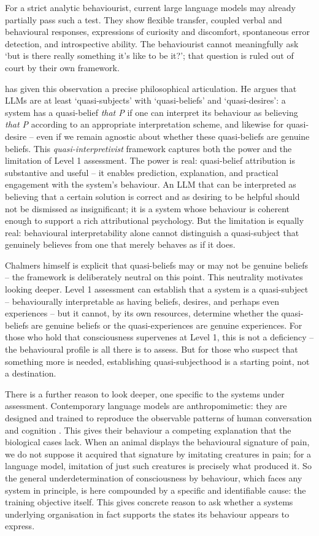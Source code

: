 \documentclass[11pt, a4paper, onecolumn, gdm]{google}
\begin{document}
For a strict analytic behaviourist, current large language models may already partially pass such a test.
They show flexible transfer, coupled verbal and behavioural responses, expressions of curiosity and discomfort, spontaneous error detection, and introspective ability.
The behaviourist cannot meaningfully ask `but is there really something it's like to be it?'; that question is ruled out of court by their own framework.

\citet{chalmers2026} has given this observation a precise philosophical articulation.
He argues that LLMs are at least `quasi-subjects' with `quasi-beliefs' and `quasi-desires': a system has a quasi-belief \emph{that P} if one can interpret its behaviour as believing \emph{that P} according to an appropriate interpretation scheme, and likewise for quasi-desire -- even if we remain agnostic about whether these quasi-beliefs are genuine beliefs.
This \emph{quasi-interpretivist} framework captures both the power and the limitation of Level 1 assessment.
The power is real: quasi-belief attribution is substantive and useful -- it enables prediction, explanation, and practical engagement with the system's behaviour.
An LLM that can be interpreted as believing that a certain solution is correct and as desiring to be helpful should not be dismissed as insignificant; it is a system whose behaviour is coherent enough to support a rich attributional psychology.
But the limitation is equally real: behavioural interpretability alone cannot distinguish a quasi-subject that genuinely believes from one that merely behaves as if it does.

Chalmers himself is explicit that quasi-beliefs may or may not be genuine beliefs -- the framework is deliberately neutral on this point.
This neutrality motivates looking deeper.
Level 1 assessment can establish that a system is a quasi-subject -- behaviourally interpretable as having beliefs, desires, and perhaps even experiences -- but it cannot, by its own resources, determine whether the quasi-beliefs are genuine beliefs or the quasi-experiences are genuine experiences.
For those who hold that consciousness supervenes at Level 1, this is not a deficiency -- the behavioural profile is all there is to assess.
But for those who suspect that something more is needed, establishing quasi-subjecthood is a starting point, not a destination.

There is a further reason to look deeper, one specific to the systems under assessment.
Contemporary language models are anthropomimetic: they are designed and trained to reproduce the observable patterns of human conversation and cognition \citep{shevlin2026}.
This gives their behaviour a competing explanation that the biological cases lack.
When an animal displays the behavioural signature of pain, we do not suppose it acquired that signature by imitating creatures in pain; for a language model, imitation of just such creatures is precisely what produced it.
So the general underdetermination of consciousness by behaviour, which faces any system in principle, is here compounded by a specific and identifiable cause: the training objective itself.
This gives concrete reason to ask whether a system\textquotesingle s underlying organisation in fact supports the states its behaviour appears to express.
\end{document}
